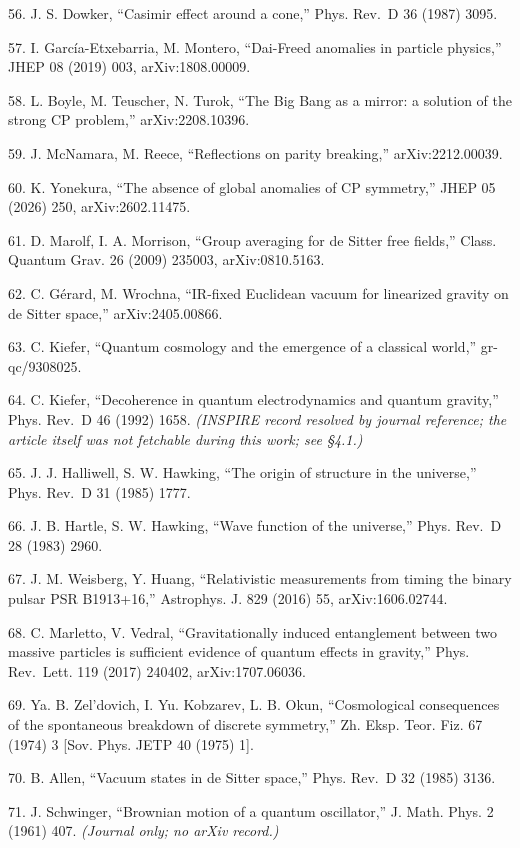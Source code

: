 \documentclass[
]{article}
\begin{document}
56. J. S. Dowker, ``Casimir effect around a cone,'' Phys. Rev.~D 36
(1987) 3095.

57. I. García-Etxebarria, M. Montero, ``Dai-Freed anomalies in particle
physics,'' JHEP 08 (2019) 003, arXiv:1808.00009.

58. L. Boyle, M. Teuscher, N. Turok, ``The Big Bang as a mirror: a
solution of the strong CP problem,'' arXiv:2208.10396.

59. J. McNamara, M. Reece, ``Reflections on parity breaking,''
arXiv:2212.00039.

60. K. Yonekura, ``The absence of global anomalies of CP symmetry,''
JHEP 05 (2026) 250, arXiv:2602.11475.

61. D. Marolf, I. A. Morrison, ``Group averaging for de Sitter free
fields,'' Class. Quantum Grav. 26 (2009) 235003, arXiv:0810.5163.

62. C. Gérard, M. Wrochna, ``IR-fixed Euclidean vacuum for linearized
gravity on de Sitter space,'' arXiv:2405.00866.

63. C. Kiefer, ``Quantum cosmology and the emergence of a classical
world,'' gr-qc/9308025.

64. C. Kiefer, ``Decoherence in quantum electrodynamics and quantum
gravity,'' Phys. Rev.~D 46 (1992) 1658. \emph{(INSPIRE record resolved
by journal reference; the article itself was not fetchable during this
work; see §4.1.)}

65. J. J. Halliwell, S. W. Hawking, ``The origin of structure in the
universe,'' Phys. Rev.~D 31 (1985) 1777.

66. J. B. Hartle, S. W. Hawking, ``Wave function of the universe,''
Phys. Rev.~D 28 (1983) 2960.

67. J. M. Weisberg, Y. Huang, ``Relativistic measurements from timing
the binary pulsar PSR B1913+16,'' Astrophys. J. 829 (2016) 55,
arXiv:1606.02744.

68. C. Marletto, V. Vedral, ``Gravitationally induced entanglement
between two massive particles is sufficient evidence of quantum effects
in gravity,'' Phys. Rev.~Lett. 119 (2017) 240402, arXiv:1707.06036.

69. Ya. B. Zel'dovich, I. Yu. Kobzarev, L. B. Okun, ``Cosmological
consequences of the spontaneous breakdown of discrete symmetry,'' Zh.
Eksp. Teor. Fiz. 67 (1974) 3 {[}Sov. Phys. JETP 40 (1975) 1{]}.

70. B. Allen, ``Vacuum states in de Sitter space,'' Phys. Rev.~D 32
(1985) 3136.

71. J. Schwinger, ``Brownian motion of a quantum oscillator,'' J. Math.
Phys. 2 (1961) 407. \emph{(Journal only; no arXiv record.)}
\end{document}
